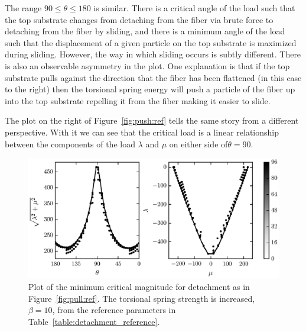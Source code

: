 The range $90 \leq \theta \leq 180$ is similar. There is a critical angle of the load such that the top substrate changes from detaching from the fiber via brute force to detaching from the fiber by sliding, and there is a minimum angle of the load such that the displacement of a given particle on the top substrate is maximized during sliding. However, the way in which sliding occurs is subtly different. There is also an observable asymmetry in the plot. One explanation is that if the top substrate pulls against the direction that the fiber has been flattened (in this case to the right) then the torsional spring energy will push a particle of the fiber up into the top substrate repelling it from the fiber making it easier to slide.

The plot on the right of Figure~\ref{fig:push:ref} tells the same story from a different perspective. With it we can see that the critical load is a linear relationship between the components of the load $\lambda$ and $\mu$ on either side of$\theta=90$\textdegree.

	\begin{figure}[t]
		\begin{center}
			\includegraphics{./fig/ch3/pull/b10/grid.eps}
		\end{center}		
		\caption{Plot of the minimum critical magnitude for detachment as in Figure~\ref{fig:pull:ref}. The torsional spring strength is increased, $\beta=10$, from the reference parameters in Table~\ref{table:detachment_reference}.
		\label{fig:pull:b10}}
	\end{figure}
	
